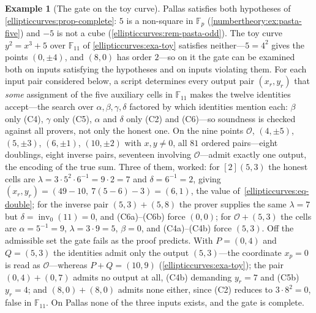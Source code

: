 \documentclass[11pt,a4paper]{article}
\theoremstyle{definition}
\newtheorem{example}[theorem]{Example}
\theoremstyle{remark}
\newcommand{\F}{\ensuremath{\mathbb{F}}}
\newcommand{\Fp}{\ensuremath{\mathbb{F}_{p}}}
\begin{document}
\begin{example}[The gate on the toy curve]
\label{ellipticcurves:exa-toy-complete}
Pallas satisfies both hypotheses of \cref{ellipticcurves:prop-complete}:
\(5\) is a non-square in \(\Fp\) (\cref{numbertheory:ex:pasta-five})
and \(-5\) is not a cube (\cref{ellipticcurves:rem-pasta-odd}). The toy
curve \(y^2 = x^3 + 5\) over \(\F_{11}\) of \cref{ellipticcurves:exa-toy}
satisfies neither---\(5 = 4^2\) gives the points \((0, \pm 4)\), and
\((8, 0)\) has order \(2\)---so on it the gate can be examined both on
inputs satisfying the hypotheses and on inputs violating them. For each
input pair considered below, a script determines every output pair
\((x_r, y_r)\) that \emph{some} assignment of the five auxiliary cells in
\(\F_{11}\) makes the twelve identities accept---the search over
\(\alpha, \beta, \gamma, \delta\) factored by which identities mention
each: \(\beta\) only (C4), \(\gamma\) only (C5), \(\alpha\) and
\(\delta\) only (C2) and (C6)---so soundness is checked against all
provers, not only the honest one. On the nine points \(\mathcal{O}\),
\((4, \pm 5)\), \((5, \pm 3)\), \((6, \pm 1)\), \((10, \pm 2)\) with
\(x, y \neq 0\), all \(81\) ordered pairs---eight doublings, eight
inverse pairs, seventeen involving \(\mathcal{O}\)---admit exactly one
output, the encoding of the true sum. Three of them, worked: for
\([2](5, 3)\) the honest cells are
\(\lambda = 3 \cdot 5^2 \cdot 6^{-1} = 9 \cdot 2 = 7\) and
\(\delta = 6^{-1} = 2\), giving
\((x_r, y_r) = (49 - 10,\ 7(5 - 6) - 3) = (6, 1)\), the value
of~\eqref{ellipticcurves:eq-double}; for the inverse pair
\((5, 3) + (5, 8)\) the prover supplies the same \(\lambda = 7\) but
\(\delta = \operatorname{inv}_0(11) = 0\), and (C6a)--(C6b) force
\((0, 0)\); for \(\mathcal{O} + (5, 3)\) the cells are
\(\alpha = 5^{-1} = 9\), \(\lambda = 3 \cdot 9 = 5\), \(\beta = 0\), and
(C4a)--(C4b) force \((5, 3)\). Off the admissible set the gate fails as
the proof predicts. With \(P = (0, 4)\) and \(Q = (5, 3)\) the identities
admit only the output \((5, 3)\)---the coordinate \(x_p = 0\) is read as
\(\mathcal{O}\)---whereas \(P + Q = (10, 9)\)
(\cref{ellipticcurves:exa-toy}); the pair \((0, 4) + (0, 7)\) admits no
output at all, (C4b) demanding \(y_r = 7\) and (C5b) \(y_r = 4\); and
\((8, 0) + (8, 0)\) admits none either, since (C2) reduces to
\(3 \cdot 8^2 = 0\), false in \(\F_{11}\). On Pallas none of the three
inputs exists, and the gate is complete.
\end{example}
\end{document}
